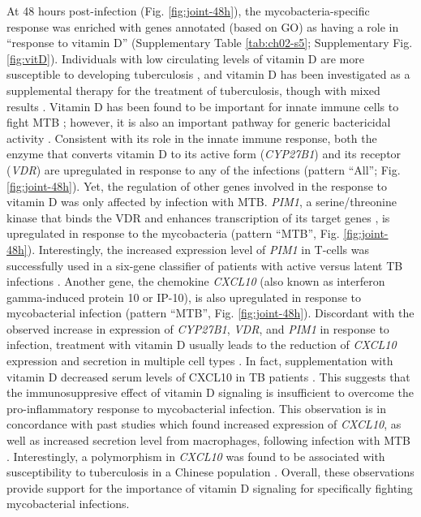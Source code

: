 At 48 hours post-infection (Fig. \ref{fig:joint-48h}), the mycobacteria-specific
response was enriched with genes annotated (based on GO) as having a
role in ``response to vitamin D'' (Supplementary Table \ref{tab:ch02-s5}; Supplementary
Fig. \ref{fig:vitD}). Individuals with low circulating levels of vitamin D are
more susceptible to developing tuberculosis \citep{Zodpey2007,
Nnoaham2008}, and vitamin D has been investigated as a supplemental
therapy for the treatment of tuberculosis, though with mixed results
\citep{Martineau2007, Lucas2014, Xia2014, Kearns2015}. Vitamin D has
been found to be important for innate immune cells to fight MTB
\citep{Liu2006, Verway2013, Xu2014}; however, it is also an important
pathway for generic bactericidal activity \citep{Hewison2011}. Consistent
with its role in the innate immune response, both the enzyme that
converts vitamin D to its active form (\emph{CYP27B1}) and its receptor
(\emph{VDR}) are upregulated in response to any of the infections
(pattern ``All''; Fig. \ref{fig:joint-48h}). Yet, the regulation of other genes involved
in the response to vitamin D was only affected by infection with MTB.
\emph{PIM1}, a serine/threonine kinase that binds the VDR and enhances
transcription of its target genes \citep{Maier2012}, is upregulated in
response to the mycobacteria (pattern ``MTB'', Fig. \ref{fig:joint-48h}). Interestingly,
the increased expression level of \emph{PIM1} in T-cells was
successfully used in a six-gene classifier of patients with active
versus latent TB infections \citep{Jacobsen2011}. Another gene, the
chemokine \emph{CXCL10} (also known as interferon gamma-induced protein
10 or IP-10), is also upregulated in response to mycobacterial infection
(pattern ``MTB'', Fig. \ref{fig:joint-48h}). Discordant with the observed increase in
expression of \emph{CYP27B1}, \emph{VDR}, and \emph{PIM1} in response to
infection, treatment with vitamin D usually leads to the reduction of
\emph{CXCL10} expression and secretion in multiple cell types
\citep{Gysemans2005, Adorini2005, Scolletta2013}. In fact,
supplementation with vitamin D decreased serum levels of CXCL10 in TB
patients \citep{Coussens2012}. This suggests that the immunosuppresive
effect of vitamin D signaling is insufficient to overcome the
pro-inflammatory response to mycobacterial infection. This observation
is in concordance with past studies which found increased expression of
\emph{CXCL10}, as well as increased secretion level from macrophages,
following infection with MTB \citep{Zhu2006, Verway2013}. Interestingly,
a polymorphism in \emph{CXCL10} was found to be associated with
susceptibility to tuberculosis in a Chinese population \citep{Tang2009,
Azad2012}. Overall, these observations provide support for the
importance of vitamin D signaling for specifically fighting
mycobacterial infections.

